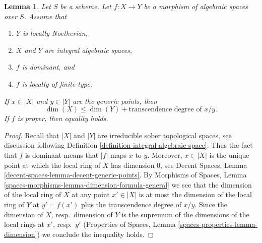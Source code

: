 \documentclass{stacks-project}
\theoremstyle{plain}
\newtheorem{lemma}[subsection]{Lemma}
\theoremstyle{definition}
\theoremstyle{remark}
\numberwithin{equation}{subsection}
\begin{document}
\begin{lemma}
\label{lemma-alteration-dimension}
Let $S$ be a scheme. Let $f : X \to Y$ be a morphism of algebraic spaces
over $S$. Assume that
\begin{enumerate}
\item $Y$ is locally Noetherian,
\item $X$ and $Y$ are integral algebraic spaces,
\item $f$ is dominant, and
\item $f$ is locally of finite type.
\end{enumerate}
If $x \in |X|$ and $y \in |Y|$ are the generic points, then
$$
\dim(X) \leq \dim(Y) + \text{transcendence degree of }x/y.
$$
If $f$ is proper, then equality holds.
\end{lemma}

\begin{proof}
Recall that $|X|$ and $|Y|$ are irreducible sober topological spaces, see
discussion following Definition \ref{definition-integral-algebraic-space}.
Thus the fact that $f$ is dominant means that $|f|$ maps $x$ to $y$.
Moreover, $x \in |X|$ is the unique point at which the
local ring of $X$ has dimension $0$, see
Decent Spaces, Lemma \ref{decent-spaces-lemma-decent-generic-points}.
By Morphisms of Spaces, Lemma
\ref{spaces-morphisms-lemma-dimension-formula-general}
we see that the dimension of the local ring of $X$ at
any point $x' \in |X|$ is at most the dimension of the local
ring of $Y$ at $y' = f(x')$ plus the transcendence degree of $x/y$.
Since the dimension of $X$, resp.\ dimension of $Y$ is the
supremum of the dimensions of the local rings at $x'$, resp.\ $y'$
(Properties of Spaces, Lemma \ref{spaces-properties-lemma-dimension})
we conclude the inequality holds.


\end{proof}
\end{document}
